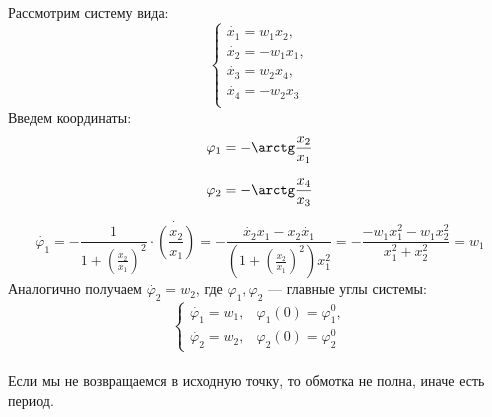 \begin{example}
	
	Рассмотрим систему вида:
	$$
		\begin{cases}
			\dot{x_1}=w_1x_2, \\
			\dot{x_2}=-w_1x_1, \\
			\dot{x_3}=w_2x_4, \\
			\dot{x_4}=-w_2x_3\\
		\end{cases}
	$$
	Введем координаты:
	$$
		\varphi_1=-\arctg \frac{x_2}{x_1}
	$$ 
	
	$$
		\varphi_2=-\arctg \frac{x_4}{x_3}
	$$
	
	$$
		\dot{\varphi_1}=-\frac{1}{1+(\frac{x_2}{x_1})^2} \cdot \dot {\left(\frac{x_2}{x_1}\right)}=-\frac{\dot{x_2}x_1-x_2\dot{x_1}}{(1+(\frac{x_2}{x_1})^2)x_1^2}=-\frac{-w_1x_1^2-w_1x_2^2}{x_1^2+x_2^2}=w_1 
	$$
	Аналогично получаем $\dot{\varphi_2}=w_2$, где $\varphi_1, \varphi_2$ --- главные углы системы:\\
	$$
		\begin{cases}
			\dot{\varphi_1}=w_1, & \varphi_1(0)=\varphi_1^0, \\
			\dot{\varphi_2}=w_2, & \varphi_2(0)=\varphi_2^0
		\end{cases}
	$$\\
	Если мы не возвращаемся в исходную точку, то обмотка не полна, иначе есть период.

\end{example}

